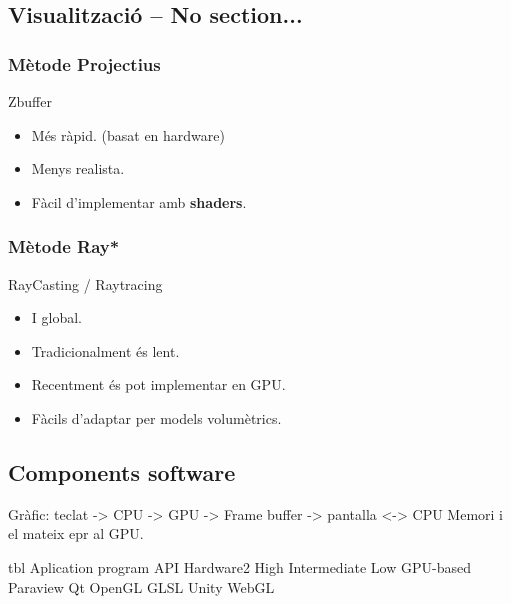 \subsection{Visualització -- No section...}
\subsubsection{Mètode Projectius}
Zbuffer
\begin{itemize}
    \item Més ràpid. (basat en hardware)
    \item Menys realista.
    \item Fàcil d'implementar amb \textbf{shaders}.
\end{itemize}

\subsubsection{Mètode Ray*}
RayCasting / Raytracing
\begin{itemize}
    \item I global.
    \item Tradicionalment és lent.
    \item Recentment és pot implementar en GPU.
    \item Fàcils d'adaptar per models volumètrics.
\end{itemize}


\subsection{Components software}
Gràfic: teclat -> CPU -> GPU -> Frame buffer -> pantalla
                <-> CPU Memori i el mateix epr al GPU.

tbl
Aplication program  API             Hardware{2}
High                Intermediate    Low     GPU-based
Paraview            Qt              OpenGL  GLSL
Unity               WebGL
